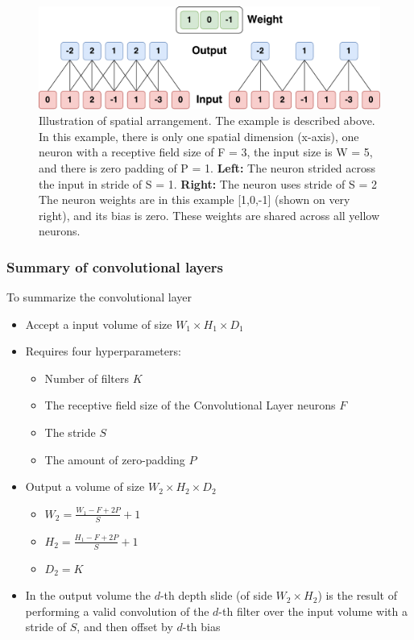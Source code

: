 \begin{figure}[H]
	\centering
	\includegraphics[width=1\textwidth]{Figures/Spatial_size.pdf}
	\caption{Illustration of spatial arrangement. The example is described above. In this example, there is only one spatial dimension (x-axis), one neuron with a receptive field size of F = 3, the input size is W = 5, and there is zero padding of P = 1. \textbf{Left:} The neuron strided across the input in stride of S = 1. \textbf{Right:} The neuron uses stride of S = 2
	The neuron weights are in this example [1,0,-1] (shown on very right), and its bias is zero. These weights are shared across all yellow neurons. \cite{CNN_course}
	}
	\label{fig:Spatial_size}
\end{figure} 

\subsubsection{Summary of convolutional layers}
To summarize the convolutional layer
\begin{itemize}
	\item Accept a input volume of size $W_1 \times  H_1 \times  D_1$
	\item Requires four hyperparameters:
	\begin{itemize}
		\item Number of filters $K$
		\item The receptive field size of the Convolutional Layer neurons $F$ 
		\item The stride $S$
		\item The amount of zero-padding $P$ 
	\end{itemize}
	\item Output a volume of size $W_2 \times  H_2 \times  D_2$
	\begin{itemize}
		\item $W_2 = \frac{W_1-F+2P}{S}+1$
		\item $H_2 = \frac{H_1-F+2P}{S}+1$
		\item $D_2 = K$
	\end{itemize}
	\item In the output volume the $d$-th depth slide (of side $W_2 \times  H_2$) is the result of performing a valid convolution of the $d$-th filter over the input volume with a stride of $S$, and then offset by $d$-th bias
\end{itemize}

